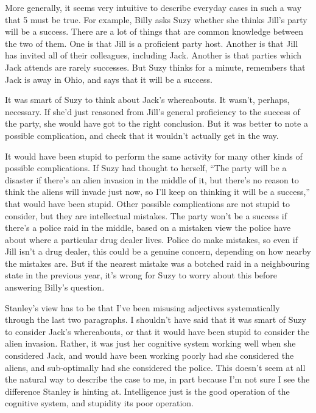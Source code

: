 \documentclass[
  11pt,
  letterpaper,
  DIV=11,
  numbers=noendperiod,
  oneside]{scrartcl}
\begin{document}
More generally, it seems very intuitive to describe everyday cases in
such a way that 5 must be true. For example, Billy asks Suzy whether she
thinks Jill's party will be a success. There are a lot of things that
are common knowledge between the two of them. One is that Jill is a
proficient party host. Another is that Jill has invited all of their
colleagues, including Jack. Another is that parties which Jack attends
are rarely successes. But Suzy thinks for a minute, remembers that Jack
is away in Ohio, and says that it will be a success.

It was smart of Suzy to think about Jack's whereabouts. It wasn't,
perhaps, necessary. If she'd just reasoned from Jill's general
proficiency to the success of the party, she would have got to the right
conclusion. But it was better to note a possible complication, and check
that it wouldn't actually get in the way.

It would have been stupid to perform the same activity for many other
kinds of possible complications. If Suzy had thought to herself, ``The
party will be a disaster if there's an alien invasion in the middle of
it, but there's no reason to think the aliens will invade just now, so
I'll keep on thinking it will be a success,'' that would have been
stupid. Other possible complications are not stupid to consider, but
they are intellectual mistakes. The party won't be a success if there's
a police raid in the middle, based on a mistaken view the police have
about where a particular drug dealer lives. Police do make mistakes, so
even if Jill isn't a drug dealer, this could be a genuine concern,
depending on how nearby the mistakes are. But if the nearest mistake was
a botched raid in a neighbouring state in the previous year, it's wrong
for Suzy to worry about this before answering Billy's question.

Stanley's view has to be that I've been misusing adjectives
systematically through the last two paragraphs. I shouldn't have said
that it was smart of Suzy to consider Jack's whereabouts, or that it
would have been stupid to consider the alien invasion. Rather, it was
just her cognitive system working well when she considered Jack, and
would have been working poorly had she considered the aliens, and
sub-optimally had she considered the police. This doesn't seem at all
the natural way to describe the case to me, in part because I'm not sure
I see the difference Stanley is hinting at. Intelligence just is the
good operation of the cognitive system, and stupidity its poor
operation.
\end{document}
